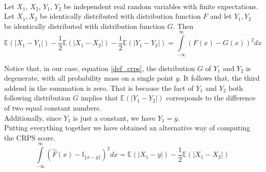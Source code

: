 \\
\begin{lemma}
    Let $X_1$, $X_2$, $Y_1$, $Y_2$ be independent real random variables with finite expectations. Let $X_1,X_2$ be identically distributed with distribution function $F$ and let $Y_1,Y_2$ be identically distributed with distribution function $G$. Then
   \begin{equation}
    \mathbb{E}(|X_1-Y_1|)-\frac{1}{2}\mathbb{E}(|X_1-X_2|)-\frac{1}{2}\mathbb{E}(|Y_1-Y_2|)=\int\limits_{-\infty}^{\infty}\left(F(x)-G(x)\right)^2dx
\end{equation}
\end{lemma}
Notice that, in our case, equation \ref{def_crps}, the distribution $G$ of $Y_1$ and $Y_2$ is degenerate, with all probability mass on a single point $y$.
It follows that, the third addend in the summation is zero. That is because the fact of $Y_1$ and $Y_2$ both following distribution $G$ implies that $\mathbb{E}(|Y_1-Y_2|)$ corresponds to the difference of two equal constant numbers.
\\
Additionally, since $Y_1$ is just a constant, we have $Y_1=y$.
\\
Putting everything together we have obtained an alternative way of computing the CRPS score.
\begin{equation}
    \int\limits_{-\infty}^{\infty}\left(\hat{F}(x)-\mathbb{I}_{\{x-y\}} \right)^2 dx=\mathbb{E}(|X_1-y|)-\frac{1}{2}\mathbb{E}(|X_1-X_2|)
\end{equation}
\\
